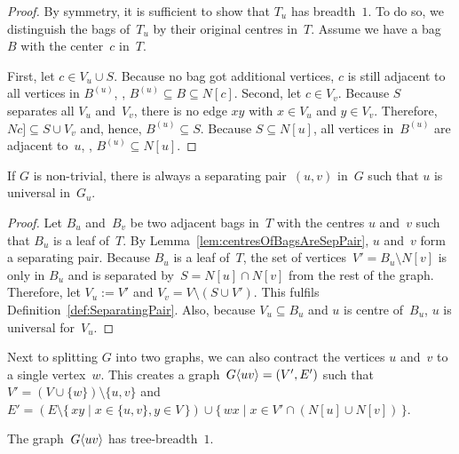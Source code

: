 \begin{proof}
By symmetry, it is sufficient to show that $T_u$ has breadth~$1$.
To do so, we distinguish the bags of~$T_u$ by their original centres in~$T$.
Assume we have a bag~$B$ with the center~$c$ in~$T$.

First, let $c \in V_u \cup S$.
Because no bag got additional vertices, $c$ is still adjacent to all vertices in $B^{(u)}$, \ie, $B^{(u)} \subseteq B \subseteq N[c]$.
Second, let $c \in V_v$.
Because $S$ separates all $V_u$ and~$V_v$, there is no edge $xy$ with $x \in V_u$ and $y \in V_v$.
Therefore, $Nc] \subseteq S \cup V_v$ and, hence, $B^{(u)} \subseteq S$.
Because $S \subseteq N[u]$, all vertices in~$B^{(u)}$ are adjacent to~$u$, \ie, $B^{(u)} \subseteq N[u]$.
\end{proof}

\begin{lemma}
    \label{lem:AlwaysUniversalGu}
If \( G \) is non-trivial, there is always a separating pair~\( (u, v) \) in~\( G \) such that \( u \) is universal in~\( G_u \).
\end{lemma}

\begin{proof}
Let $B_u$ and~$B_v$ be two adjacent bags in~$T$ with the centres $u$ and~$v$ such that $B_u$ is a leaf of~$T$.
By Lemma~\ref{lem:centresOfBagsAreSepPair}, $u$ and~$v$ form a separating pair.
Because $B_u$ is a leaf of~$T$, the set of vertices~$V' = B_u \setminus N[v]$ is only in $B_u$ and is separated by~$S = N[u] \cap N[v]$ from the rest of the graph.
Therefore, let $V_u := V'$ and $V_v = V \setminus (S \cup V')$.
This fulfils Definition~\ref{def:SeparatingPair}.
Also, because $V_u \subseteq B_u$ and $u$ is centre of~$B_u$, $u$ is universal for~$V_u$.
\end{proof}

Next to splitting $G$ into two graphs, we can also contract the vertices $u$ and~$v$ to a single vertex~$w$.
This creates a graph~$G \langle uv \rangle = (V', E')$ such that $V' = (V \cup \{ w \}) \setminus \{ u, v \}$ and $E' = (E \setminus \{ \, xy \mid x \in \{ u, v \}, y \in V \, \}) \cup \{ \, wx \mid x \in V' \cap (N[u] \cup N[v]) \, \}$.

\begin{lemma}
    \label{lem:GuvTB1}
The graph~\( G \langle uv \rangle \) has tree-breadth~\( 1 \).
\end{lemma}

